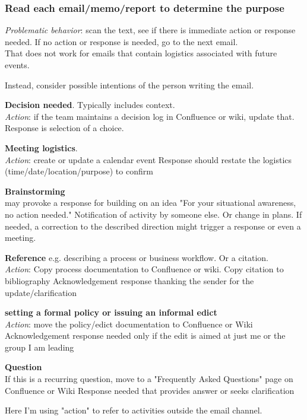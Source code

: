 \subsubsection{Read each email/memo/report to determine the purpose }

\textit{Problematic behavior}: scan the text, see if there is immediate action or response needed. If no action or response is needed, go to the next email. \\
 That does not work for emails that contain logistics associated with future events. 

Instead, consider possible intentions of the person writing the email. 

\textbf{Decision needed}.  Typically includes context. \\
\textit{Action}: if the team maintains a decision log in Confluence or wiki, update that.
Response is selection of a choice.

\textbf{Meeting logistics}.\\
\textit{Action}: create or update a calendar event
Response should restate the logistics (time/date/location/purpose) to confirm

\textbf{Brainstorming}\\
may provoke a response for building on an idea
"For your situational awareness, no action needed." Notification of activity by someone else. Or change in plans. 
If needed, a correction to the described direction might trigger a response or even a meeting.

\textbf{Reference} e.g. describing a process or business workflow. Or a citation.\\
\textit{Action}: Copy process documentation to Confluence or wiki. Copy citation to bibliography
Acknowledgement response thanking the sender for the update/clarification

\textbf{setting a formal policy or issuing an informal edict}\\
\textit{Action}: move the policy/edict documentation to Confluence or Wiki
Acknowledgement response needed only if the edit is aimed at just me or the group I am leading

\textbf{Question}\\
If this is a recurring question, move to a "Frequently Asked Questions" page on Confluence or Wiki
Response needed that provides answer or seeks clarification


Here I'm using "action" to refer to activities outside the email channel. 

